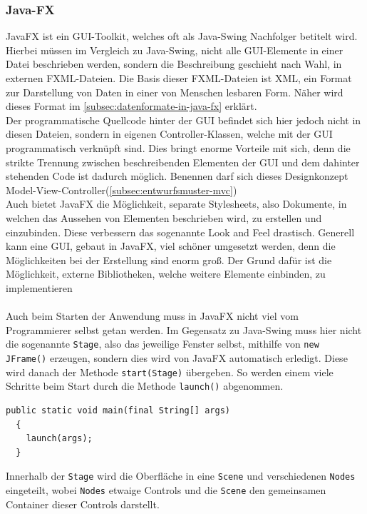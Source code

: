 \subsubsection{Java-FX}\label{sssec: JavaFX}
JavaFX ist ein GUI-Toolkit, welches oft als Java-Swing Nachfolger betitelt wird.
Hierbei müssen im Vergleich zu Java-Swing, nicht alle GUI-Elemente in einer Datei beschrieben werden, sondern die Beschreibung geschieht nach Wahl, in externen FXML-Dateien.
Die Basis dieser FXML-Dateien ist XML, ein Format zur Darstellung von Daten in einer von Menschen lesbaren Form.
Näher wird dieses Format im \autoref{subsec:datenformate-in-java-fx} erklärt.\\
Der programmatische Quellcode hinter der GUI befindet sich hier jedoch nicht in diesen Dateien, sondern in eigenen Controller-Klassen, welche mit der GUI programmatisch verknüpft sind.
Dies bringt enorme Vorteile mit sich, denn die strikte Trennung zwischen beschreibenden Elementen der GUI und dem dahinter stehenden Code ist dadurch möglich.
Benennen darf sich dieses Designkonzept Model-View-Controller(\autoref{subsec:entwurfsmuster-mvc})\\
Auch bietet JavaFX die Möglichkeit, separate Stylesheets, also Dokumente, in welchen das Aussehen von Elementen beschrieben wird, zu erstellen und einzubinden.
Diese verbessern das sogenannte Look and Feel drastisch.
Generell kann eine GUI, gebaut in JavaFX, viel schöner umgesetzt werden, denn die Möglichkeiten bei der Erstellung sind enorm groß.
Der Grund dafür ist die Möglichkeit, externe Bibliotheken, welche weitere Elemente einbinden, zu implementieren\\\\
Auch beim Starten der Anwendung muss in JavaFX nicht viel vom Programmierer selbst getan werden.
Im Gegensatz zu Java-Swing muss hier nicht die sogenannte \lstinline[style=java]{Stage}, also das jeweilige Fenster selbst, mithilfe von \lstinline[style=java]{new JFrame()} erzeugen, sondern dies wird von JavaFX automatisch erledigt.
Diese wird danach der Methode \lstinline[style=java]{start(Stage)} übergeben.
So werden einem viele Schritte beim Start durch die Methode \lstinline[style=java]{launch()} abgenommen.
\begin{lstlisting}[style=java,caption=JavaFX Startvorgang,label=javafxStart]
  public static void main(final String[] args)
  {
    launch(args);
  }
\end{lstlisting}
Innerhalb der \lstinline[style=java]{Stage} wird die Oberfläche in eine \lstinline[style=java]{Scene} und verschiedenen \lstinline[style=java]{Nodes} eingeteilt, wobei \lstinline[style=java]{Nodes} etwaige Controls und die \lstinline[style=java]{Scene} den gemeinsamen Container dieser Controls darstellt.
